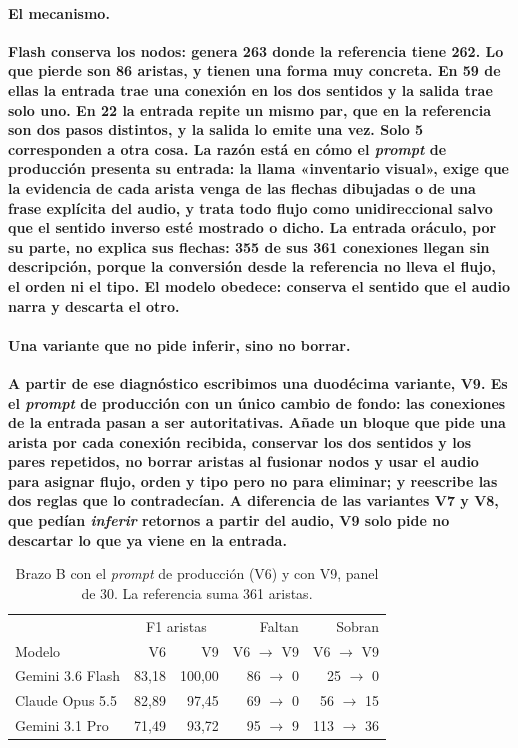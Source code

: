 \documentclass[a4paper, twocolumn, 10pt]{IEEEtran}
\newcommand{\nuevo}[1]{{\bfseries #1}}
\begin{document}
\paragraph{\nuevo{El mecanismo.}} \nuevo{Flash conserva los nodos: genera 263 donde la
referencia tiene 262. Lo que pierde son 86 aristas, y tienen una forma muy
concreta. En 59 de ellas la entrada trae una conexión en los dos sentidos y la
salida trae solo uno. En 22 la entrada repite un mismo par, que en la referencia
son dos pasos distintos, y la salida lo emite una vez. Solo 5 corresponden a otra
cosa. La razón está en cómo el \emph{prompt} de producción presenta su entrada: la
llama «inventario visual», exige que la evidencia de cada arista venga de las
flechas dibujadas o de una frase explícita del audio, y trata todo flujo como
unidireccional salvo que el sentido inverso esté mostrado o dicho. La entrada
oráculo, por su parte, no explica sus flechas: 355 de sus 361 conexiones llegan sin
descripción, porque la conversión desde la referencia no lleva el flujo, el orden
ni el tipo. El modelo obedece: conserva el sentido que el audio narra y descarta el
otro.}

\paragraph{\nuevo{Una variante que no pide inferir, sino no borrar.}} \nuevo{A partir de ese
diagnóstico escribimos una duodécima variante, V9. Es el \emph{prompt} de producción
con un único cambio de fondo: las conexiones de la entrada pasan a ser
autoritativas. Añade un bloque que pide una arista por cada conexión recibida,
conservar los dos sentidos y los pares repetidos, no borrar aristas al fusionar
nodos y usar el audio para asignar flujo, orden y tipo pero no para eliminar; y
reescribe las dos reglas que lo contradecían. A diferencia de las variantes V7 y V8,
que pedían \emph{inferir} retornos a partir del audio, V9 solo pide no descartar lo
que ya viene en la entrada.}

\begin{table}[H]
\centering\footnotesize\setlength{\tabcolsep}{3pt}\bfseries
\caption{Brazo B con el \emph{prompt} de producción (V6) y con V9, panel de 30. La
referencia suma 361 aristas.}
\label{tab:ledgerB}
\begin{tabular}{lrrrr}
\toprule
 & \multicolumn{2}{c}{F1 aristas} & Faltan & Sobran\\
Modelo & V6 & V9 & V6 $\rightarrow$ V9 & V6 $\rightarrow$ V9\\
\midrule
Gemini 3.6 Flash & 83,18 & 100,00 & 86 $\rightarrow$ 0 & 25 $\rightarrow$ 0\\
Claude Opus 5.5  & 82,89 & 97,45  & 69 $\rightarrow$ 0 & 56 $\rightarrow$ 15\\
Gemini 3.1 Pro   & 71,49 & 93,72  & 95 $\rightarrow$ 9 & 113 $\rightarrow$ 36\\
\bottomrule
\end{tabular}
\end{table}
\end{document}
